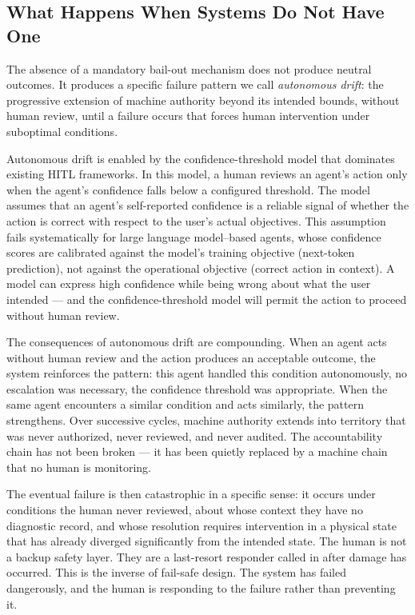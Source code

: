 \subsection*{What Happens When Systems Do Not Have One}
\label{sec:intro:what-happens-without}

The absence of a mandatory bail-out mechanism does not produce neutral outcomes. It produces a specific failure pattern we call \textit{autonomous drift}: the progressive extension of machine authority beyond its intended bounds, without human review, until a failure occurs that forces human intervention under suboptimal conditions.

Autonomous drift is enabled by the confidence-threshold model that dominates existing HITL frameworks. In this model, a human reviews an agent's action only when the agent's confidence falls below a configured threshold. The model assumes that an agent's self-reported confidence is a reliable signal of whether the action is correct with respect to the user's actual objectives. This assumption fails systematically for large language model--based agents, whose confidence scores are calibrated against the model's training objective (next-token prediction), not against the operational objective (correct action in context). A model can express high confidence while being wrong about what the user intended — and the confidence-threshold model will permit the action to proceed without human review.

The consequences of autonomous drift are compounding. When an agent acts without human review and the action produces an acceptable outcome, the system reinforces the pattern: this agent handled this condition autonomously, no escalation was necessary, the confidence threshold was appropriate. When the same agent encounters a similar condition and acts similarly, the pattern strengthens. Over successive cycles, machine authority extends into territory that was never authorized, never reviewed, and never audited. The accountability chain has not been broken — it has been quietly replaced by a machine chain that no human is monitoring.

The eventual failure is then catastrophic in a specific sense: it occurs under conditions the human never reviewed, about whose context they have no diagnostic record, and whose resolution requires intervention in a physical state that has already diverged significantly from the intended state. The human is not a backup safety layer. They are a last-resort responder called in after damage has occurred. This is the inverse of fail-safe design. The system has failed dangerously, and the human is responding to the failure rather than preventing it.

